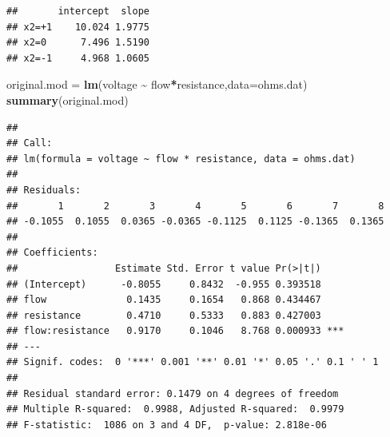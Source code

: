\documentclass[
]{article}
\newenvironment{Shaded}{\begin{snugshade}}{\end{snugshade}}
\newcommand{\AttributeTok}[1]{\textcolor[rgb]{0.13,0.29,0.53}{#1}}
\newcommand{\DecValTok}[1]{\textcolor[rgb]{0.00,0.00,0.81}{#1}}
\newcommand{\FunctionTok}[1]{\textcolor[rgb]{0.13,0.29,0.53}{\textbf{#1}}}
\newcommand{\NormalTok}[1]{#1}
\newcommand{\OtherTok}[1]{\textcolor[rgb]{0.56,0.35,0.01}{#1}}
\newcommand{\SpecialCharTok}[1]{\textcolor[rgb]{0.81,0.36,0.00}{\textbf{#1}}}
\newcommand{\StringTok}[1]{\textcolor[rgb]{0.31,0.60,0.02}{#1}}
\begin{document}
\begin{Shaded}
\end{Shaded}

\begin{verbatim}
##       intercept  slope
## x2=+1    10.024 1.9775
## x2=0      7.496 1.5190
## x2=-1     4.968 1.0605
\end{verbatim}

\begin{Shaded}
\begin{Highlighting}[]
\NormalTok{original.mod }\OtherTok{=} \FunctionTok{lm}\NormalTok{(voltage }\SpecialCharTok{\textasciitilde{}}\NormalTok{ flow}\SpecialCharTok{*}\NormalTok{resistance,}\AttributeTok{data=}\NormalTok{ohms.dat)}
\FunctionTok{summary}\NormalTok{(original.mod)}
\end{Highlighting}
\end{Shaded}

\begin{verbatim}
## 
## Call:
## lm(formula = voltage ~ flow * resistance, data = ohms.dat)
## 
## Residuals:
##       1       2       3       4       5       6       7       8 
## -0.1055  0.1055  0.0365 -0.0365 -0.1125  0.1125 -0.1365  0.1365 
## 
## Coefficients:
##                 Estimate Std. Error t value Pr(>|t|)    
## (Intercept)      -0.8055     0.8432  -0.955 0.393518    
## flow              0.1435     0.1654   0.868 0.434467    
## resistance        0.4710     0.5333   0.883 0.427003    
## flow:resistance   0.9170     0.1046   8.768 0.000933 ***
## ---
## Signif. codes:  0 '***' 0.001 '**' 0.01 '*' 0.05 '.' 0.1 ' ' 1
## 
## Residual standard error: 0.1479 on 4 degrees of freedom
## Multiple R-squared:  0.9988, Adjusted R-squared:  0.9979 
## F-statistic:  1086 on 3 and 4 DF,  p-value: 2.818e-06
\end{verbatim}
\end{document}
